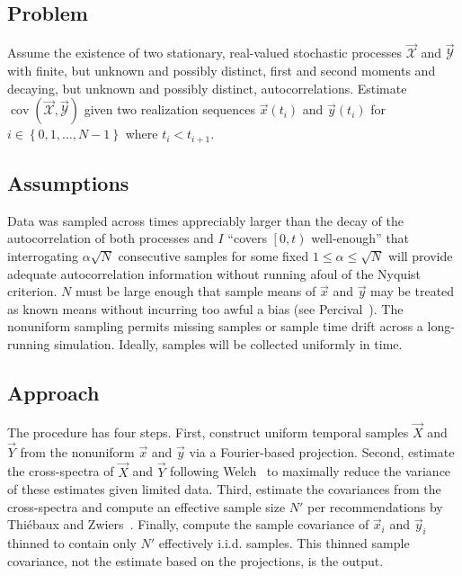 \documentclass[letterpaper,11pt,nointlimits,reqno]{amsart}
\DeclareMathOperator{\cov}{cov}
\begin{document}
\subsection*{Problem}

Assume the existence of two stationary, real-valued stochastic processes
$\vec{\mathscr{X}}$ and $\vec{\mathscr{Y}}$ with finite, but unknown and
possibly distinct, first and second moments and decaying, but unknown and
possibly distinct, autocorrelations.  Estimate
$\cov\left(\vec{\mathscr{X}},\vec{\mathscr{Y}}\right)$ given two realization
sequences $\vec{x}\left(t_i\right)$ and $\vec{y}\left(t_i\right)$ for
$i\in\left\{0,1,\dots,N-1\right\}$ where $t_i < t_{i+1}$.

\subsection*{Assumptions}

Data was sampled across times appreciably larger than the decay of the
autocorrelation of both processes and $I$ ``covers $\left[0,t\right)$
well-enough'' that interrogating $\alpha \sqrt{N}$ consecutive samples for some
fixed $1\le\alpha\le\sqrt{N}$ will provide adequate autocorrelation information
without running afoul of the Nyquist criterion.  $N$ must be large enough that
sample means of $\vec{x}$ and $\vec{y}$ may be treated as known means without
incurring too awful a bias (see Percival~\cite{Percival1993Three}).  The
nonuniform sampling permits missing samples or sample time drift across a
long-running simulation.  Ideally, samples will be collected uniformly in time.

\subsection*{Approach}

The procedure has four steps.  First, construct uniform temporal samples
$\vec{X}$ and $\vec{Y}$ from the nonuniform $\vec{x}$ and $\vec{y}$ via a
Fourier-based projection.  Second, estimate the cross-spectra of $\vec{X}$ and
$\vec{Y}$ following Welch~\cite{Welch1967Use} to maximally reduce the variance
of these estimates given limited data.  Third, estimate the covariances from
the cross-spectra and compute an effective sample size $N'$ per recommendations
by Thi\'{e}baux and Zwiers~\cite{Thiebaux1984Interpretation}.  Finally, compute
the sample covariance of $\vec{x}_i$ and $\vec{y}_i$ thinned to contain only
$N'$ effectively i.i.d. samples.  This thinned sample covariance, not the
estimate based on the projections, is the output.
\end{document}
